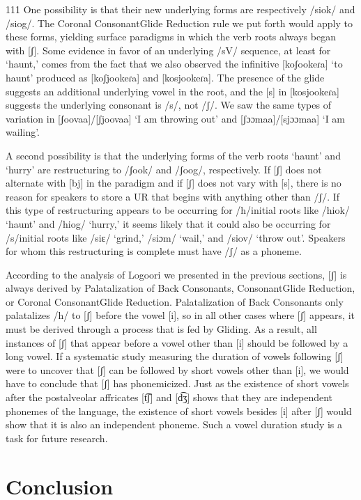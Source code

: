 \documentclass[output=paper]{langsci/langscibook}
\begin{document}
\begin{tabular}{111}
One possibility is that their new underlying forms are respectively /siok/ and /siog/. The Coronal ConsonantGlide Reduction rule we put forth would apply to these forms, yielding surface paradigms in which the verb roots always began with [ʃ]. Some evidence in favor of an underlying /sV/ sequence, at least for ‘haunt,’ comes from the fact that we also observed the infinitive [koʃookeɾa] ‘to haunt’ produced as [koʃjookeɾa] and [kosjookeɾa]. The presence of the glide suggests an additional underlying vowel in the root, and the [s] in [kosjookeɾa] suggests the underlying consonant is /s/, not /ʃ/. We saw the same types of variation in [ʃoovaa]/[ʃjoovaa] ‘I am throwing out’ and [ʃɔɔmaa]/[sjɔɔmaa] ‘I am wailing’. 

A second possibility is that the underlying forms of the verb roots ‘haunt’ and ‘hurry’ are restructuring to /ʃook/ and /ʃoog/, respectively. If [ʃ] does not alternate with [bj] in the paradigm and if [ʃ] does not vary with [s], there is no reason for speakers to store a UR that begins with anything other than /ʃ/. If this type of restructuring appears to be occurring for /h/initial roots like /hiok/ ‘haunt’ and /hiog/ ‘hurry,’ it seems likely that it could also be occurring for /s/initial roots like /siɛ/ ‘grind,’ /siɔm/ ‘wail,’ and /siov/ ‘throw out’. Speakers for whom this restructuring is complete must have /ʃ/ as a phoneme. 

According to the analysis of Logoori we presented in the previous sections, [ʃ] is always derived by Palatalization of Back Consonants, ConsonantGlide Reduction, or Coronal ConsonantGlide Reduction. Palatalization of Back Consonants only palatalizes /h/ to [ʃ] before the vowel [i], so in all other cases where [ʃ] appears, it must be derived through a process that is fed by Gliding. As a result, all instances of [ʃ] that appear before a vowel other than [i] should be followed by a long vowel. If a systematic study measuring the duration of vowels following [ʃ] were to uncover that [ʃ] can be followed by short vowels other than [i], we would have to conclude that [ʃ] has phonemicized. Just as the existence of short vowels after the postalveolar affricates [t͡ʃ] and [d͡ʒ] shows that they are independent phonemes of the language, the existence of short vowels besides [i] after [ʃ] would show that it is also an independent phoneme. Such a vowel duration study is a task for future research.

\section{Conclusion}


\end{tabular}
\end{document}
